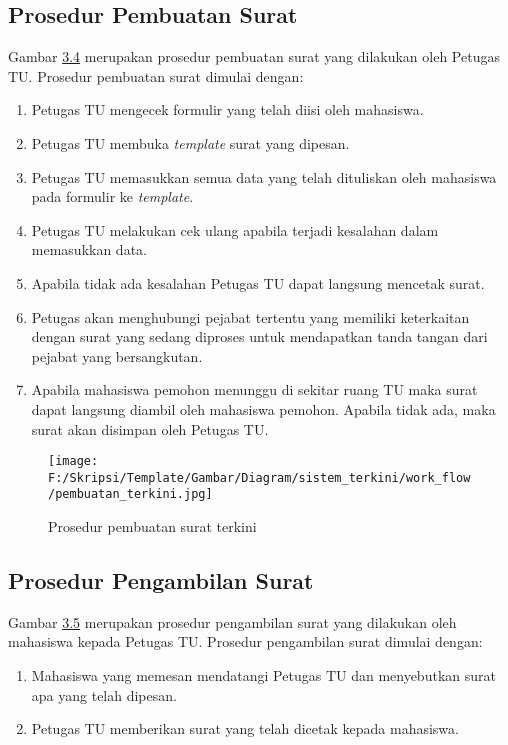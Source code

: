 \subsection{Prosedur Pembuatan Surat}
\label{sec:prosedur_pembuatan_surat}
Gambar \hyperlink{pembuatan_terkini}{3.4} merupakan prosedur pembuatan surat yang dilakukan oleh Petugas TU. Prosedur pembuatan surat dimulai dengan:
\begin{enumerate}
	\item Petugas TU mengecek formulir yang telah diisi oleh mahasiswa.
	\item Petugas TU membuka \textit{template} surat yang dipesan.
	\item Petugas TU memasukkan semua data yang telah dituliskan oleh mahasiswa pada formulir ke \textit{template}.
	\item Petugas TU melakukan cek ulang apabila terjadi kesalahan dalam memasukkan data.
	\item Apabila tidak ada kesalahan Petugas TU dapat langsung mencetak surat.
	\item Petugas akan menghubungi pejabat tertentu yang memiliki keterkaitan dengan surat yang sedang diproses untuk mendapatkan tanda tangan dari pejabat yang bersangkutan.
	\item Apabila mahasiswa pemohon menunggu di sekitar ruang TU maka surat dapat langsung diambil oleh mahasiswa pemohon. Apabila tidak ada, maka surat akan disimpan oleh Petugas TU.
\end{enumerate}

\begin{figure}[H]
	\centering
		\texttt{[image: F:/Skripsi/Template/Gambar/Diagram/sistem\_terkini/work\_flow/pembuatan\_terkini.jpg]}
	{\caption{Prosedur pembuatan surat terkini}}
	\label{fig:pembuatan_terkini}
\end{figure}

\subsection{Prosedur Pengambilan Surat}
\label{sec:prosedur_pengambilan_surat}
Gambar \hyperlink{pengambilan_terkini}{3.5} merupakan prosedur pengambilan surat yang dilakukan oleh mahasiswa kepada Petugas TU. Prosedur pengambilan surat dimulai dengan:
\begin{enumerate}
	\item Mahasiswa yang memesan mendatangi Petugas TU dan menyebutkan surat apa yang telah dipesan.
	\item Petugas TU memberikan surat yang telah dicetak kepada mahasiswa.
\end{enumerate}

